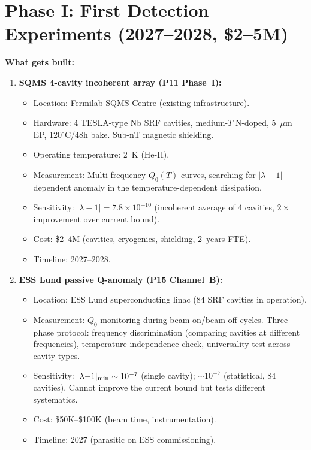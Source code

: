 \documentclass[11pt]{article}
\newcommand{\ee}[1]{\times 10^{#1}}
\newcommand{\lambdaone}{|\lambda{-}1|}
\begin{document}
\section{Phase I: First Detection Experiments (2027--2028, \$2--5M)}
\label{sec:phase1}

\begin{tcolorbox}[colback=blue!5!white, colframe=blue!60!black,
  title=\textbf{Phase I: SQMS 4-Cavity + ESS Channel B}]

\textbf{What gets built:}

\begin{enumerate}
\item \textbf{SQMS 4-cavity incoherent array (P11 Phase~I):}
  \begin{itemize}[nosep]
    \item Location: Fermilab SQMS Centre (existing infrastructure).
    \item Hardware: 4 TESLA-type Nb SRF cavities, medium-$T$ N-doped,
      5~$\mu$m EP, 120$^\circ$C/48h bake. Sub-nT magnetic shielding.
    \item Operating temperature: 2~K (He-II).
    \item Measurement: Multi-frequency $Q_0(T)$ curves, searching for
      $\lambdaone$-dependent anomaly in the temperature-dependent
      dissipation.
    \item Sensitivity: $\lambdaone = 7.8\ee{-10}$ (incoherent average
      of 4 cavities, $2\times$ improvement over current bound).
    \item Cost: \$2--4M (cavities, cryogenics, shielding, 2~years FTE).
    \item Timeline: 2027--2028.
  \end{itemize}

\item \textbf{ESS Lund passive Q-anomaly (P15 Channel~B):}
  \begin{itemize}[nosep]
    \item Location: ESS Lund superconducting linac (84 SRF cavities
      in operation).
    \item Measurement: $Q_0$ monitoring during beam-on/beam-off cycles.
      Three-phase protocol: frequency discrimination (comparing
      cavities at different frequencies), temperature independence
      check, universality test across cavity types.
    \item Sensitivity: $\lambdaone_{\rm min} \sim 10^{-7}$ (single
      cavity); $\sim 10^{-7}$ (statistical, 84 cavities). Cannot
      improve the current bound but tests different systematics.
    \item Cost: \$50K--\$100K (beam time, instrumentation).
    \item Timeline: 2027 (parasitic on ESS commissioning).
  \end{itemize}
\end{enumerate}


\end{tcolorbox}
\end{document}
